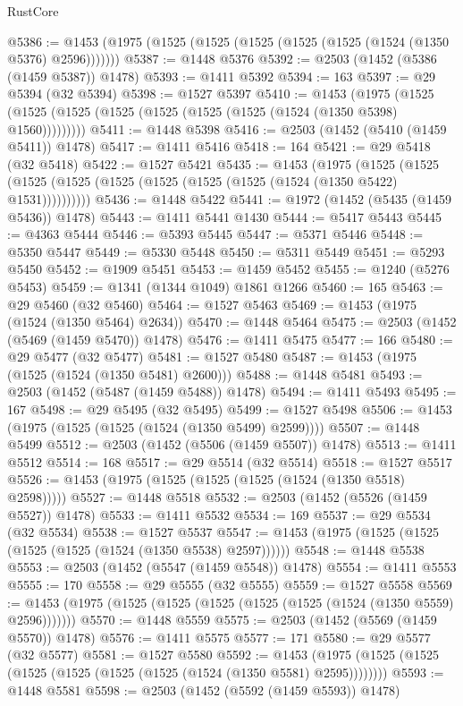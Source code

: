 \begin{lexlean}{RustCore}
\begin{coremodule}
{\begin{coremodule}
{{{{{{{{{{{{{{{{{{{{{{{{{{{{{{{{{{{{{{{{{{{{{@5386 := @1453 (@1975 (@1525 (@1525 (@1525 (@1525 (@1525 (@1524 (@1350 @5376) @2596)))))))
@5387 := @1448 @5376
@5392 := @2503 (@1452 (@5386 (@1459 @5387)) @1478)
@5393 := @1411 @5392
@5394 := 163
@5397 := @29 @5394 (@32 @5394)
@5398 := @1527 @5397
@5410 := @1453
    (@1975 (@1525 (@1525 (@1525 (@1525 (@1525 (@1525 (@1525 (@1524 (@1350 @5398) @1560)))))))))
@5411 := @1448 @5398
@5416 := @2503 (@1452 (@5410 (@1459 @5411)) @1478)
@5417 := @1411 @5416
@5418 := 164
@5421 := @29 @5418 (@32 @5418)
@5422 := @1527 @5421
@5435 := @1453
    (@1975
      (@1525 (@1525 (@1525 (@1525 (@1525 (@1525 (@1525 (@1525 (@1524 (@1350 @5422) @1531))))))))))
@5436 := @1448 @5422
@5441 := @1972 (@1452 (@5435 (@1459 @5436)) @1478)
@5443 := @1411 @5441 @1430
@5444 := @5417 @5443
@5445 := @4363 @5444
@5446 := @5393 @5445
@5447 := @5371 @5446
@5448 := @5350 @5447
@5449 := @5330 @5448
@5450 := @5311 @5449
@5451 := @5293 @5450
@5452 := @1909 @5451
@5453 := @1459 @5452
@5455 := @1240 (@5276 @5453)
@5459 := @1341 (@1344 @1049) @1861 @1266
@5460 := 165
@5463 := @29 @5460 (@32 @5460)
@5464 := @1527 @5463
@5469 := @1453 (@1975 (@1524 (@1350 @5464) @2634))
@5470 := @1448 @5464
@5475 := @2503 (@1452 (@5469 (@1459 @5470)) @1478)
@5476 := @1411 @5475
@5477 := 166
@5480 := @29 @5477 (@32 @5477)
@5481 := @1527 @5480
@5487 := @1453 (@1975 (@1525 (@1524 (@1350 @5481) @2600)))
@5488 := @1448 @5481
@5493 := @2503 (@1452 (@5487 (@1459 @5488)) @1478)
@5494 := @1411 @5493
@5495 := 167
@5498 := @29 @5495 (@32 @5495)
@5499 := @1527 @5498
@5506 := @1453 (@1975 (@1525 (@1525 (@1524 (@1350 @5499) @2599))))
@5507 := @1448 @5499
@5512 := @2503 (@1452 (@5506 (@1459 @5507)) @1478)
@5513 := @1411 @5512
@5514 := 168
@5517 := @29 @5514 (@32 @5514)
@5518 := @1527 @5517
@5526 := @1453 (@1975 (@1525 (@1525 (@1525 (@1524 (@1350 @5518) @2598)))))
@5527 := @1448 @5518
@5532 := @2503 (@1452 (@5526 (@1459 @5527)) @1478)
@5533 := @1411 @5532
@5534 := 169
@5537 := @29 @5534 (@32 @5534)
@5538 := @1527 @5537
@5547 := @1453 (@1975 (@1525 (@1525 (@1525 (@1525 (@1524 (@1350 @5538) @2597))))))
@5548 := @1448 @5538
@5553 := @2503 (@1452 (@5547 (@1459 @5548)) @1478)
@5554 := @1411 @5553
@5555 := 170
@5558 := @29 @5555 (@32 @5555)
@5559 := @1527 @5558
@5569 := @1453 (@1975 (@1525 (@1525 (@1525 (@1525 (@1525 (@1524 (@1350 @5559) @2596)))))))
@5570 := @1448 @5559
@5575 := @2503 (@1452 (@5569 (@1459 @5570)) @1478)
@5576 := @1411 @5575
@5577 := 171
@5580 := @29 @5577 (@32 @5577)
@5581 := @1527 @5580
@5592 := @1453 (@1975 (@1525 (@1525 (@1525 (@1525 (@1525 (@1525 (@1524 (@1350 @5581) @2595))))))))
@5593 := @1448 @5581
@5598 := @2503 (@1452 (@5592 (@1459 @5593)) @1478)
}}}}}}}}}}}}}}}}}}}}}}}}}}}}}}}}}}}}}}}}}}}}}
\end{coremodule}}
\end{coremodule}
\end{lexlean}
